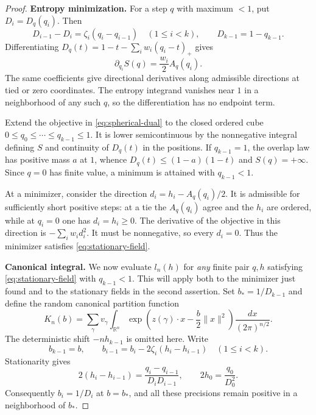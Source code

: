 \documentclass[11pt]{article}
\begin{document}
\begin{proof}
\textbf{Entropy minimization.}
For a step $q$ with maximum $<1$, put $D_i=D_q(q_i)$. Then
\[
 D_{i-1}-D_i=\zeta_i(q_i-q_{i-1})\quad(1\le i<k),
 \qquad D_{k-1}=1-q_{k-1}.
\]
Differentiating $D_q(t)=1-t-\sum_iw_i(q_i-t)_+$ gives
\[
 \partial_{q_i}S(q)=\frac{w_i}{2}A_q(q_i).
\]
The same coefficients give directional derivatives along admissible directions
at tied or zero coordinates. The entropy integrand vanishes near $1$ in a
neighborhood of any such $q$, so the differentiation has no endpoint term.

Extend the objective in \eqref{eq:spherical-dual} to the closed ordered cube
$0\le q_0\le\cdots\le q_{k-1}\le1$. It is lower semicontinuous by the
nonnegative integral defining $S$ and continuity of $D_q(t)$ in the positions.
If $q_{k-1}=1$, the overlap law has positive mass $a$ at $1$, whence
$D_q(t)\le(1-a)(1-t)$ and $S(q)=+\infty$. Since $q=0$ has finite value,
a minimum is attained with $q_{k-1}<1$.

At a minimizer, consider the direction
$d_i=h_i-A_q(q_i)/2$. It is admissible for sufficiently short positive
steps: at a tie the $A_q(q_i)$ agree and the $h_i$ are ordered, while at
$q_i=0$ one has $d_i=h_i\ge0$. The derivative of the objective in this
direction is $-\sum_iw_id_i^2$. It must be nonnegative, so every $d_i=0$.
Thus the minimizer satisfies \eqref{eq:stationary-field}.

\textbf{Canonical integral.}
We now evaluate $l_n(h)$ for \emph{any} finite pair $q,h$ satisfying
\eqref{eq:stationary-field} with $q_{k-1}<1$. This will apply both to the
minimizer just found and to the stationary fields in the second assertion.
Set $b_*=1/D_{k-1}$ and define the random canonical partition function
\[
 K_n(b)=\sum_\gamma v_\gamma
 \int_{\mathbb R^n}
 \exp\left(z(\gamma)\cdot x-\frac b2\|x\|^2\right)
 \frac{dx}{(2\pi)^{n/2}}.
\]
The deterministic shift $-nh_{k-1}$ is omitted here. Write
\[
 b_{k-1}=b,\qquad
 b_{i-1}=b_i-2\zeta_i(h_i-h_{i-1})\quad(1\le i<k).
\]
Stationarity gives
\[
 2(h_i-h_{i-1})=\frac{q_i-q_{i-1}}{D_iD_{i-1}},
 \qquad 2h_0=\frac{q_0}{D_0^2}.
\]
Consequently $b_i=1/D_i$ at $b=b_*$, and all these precisions remain
positive in a neighborhood of $b_*$.


\end{proof}
\end{document}
